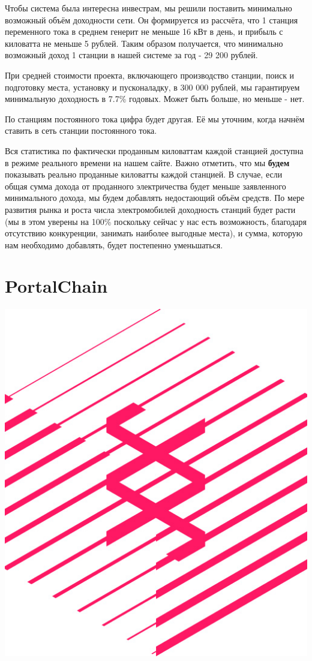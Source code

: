 \documentclass[a4paper,12pt]{report}
\begin{document}
Чтобы система была интересна инвестрам, мы решили поставить минимально возможный объём доходности сети. Он формируется из рассчёта, что 1 станция переменного тока в среднем генерит не меньше 16 кВт в день, и прибыль с киловатта не меньше 5 рублей. Таким образом получается, что минимально возможный доход 1 станции в нашей системе за год - 29 200 рублей. 

При средней стоимости проекта, включающего производство станции, поиск и подготовку места, установку и пусконаладку, в 300 000 рублей, мы гарантируем минимальную доходность в 7.7\% годовых. Может быть больше, но меньше - нет.


По станциям постоянного тока цифра будет другая. Её мы уточним, когда начнём ставить в сеть станции постоянного тока.


Вся статистика по фактически проданным киловаттам каждой станцией доступна в режиме реального времени на нашем сайте. Важно отметить, что мы \textbf{будем} показывать реально проданные киловатты каждой станцией. В случае, если общая сумма дохода от проданного электричества будет меньше заявленного минимального дохода, мы будем добавлять недостающий объём средств. По мере развития рынка и роста числа электромобилей доходность станций будет расти (мы в этом уверены на 100\% поскольку сейчас у нас есть возможность, благодаря отсутствию конкуренции, занимать наиболее выгодные места), и сумма, которую нам необходимо добавлять, будет постепенно уменьшаться. 

\section{PortalChain}

\vspace*{0.5cm}
\includegraphics[width=13.6cm]{substrate-logo}
\vspace*{0.5cm}
\end{document}
